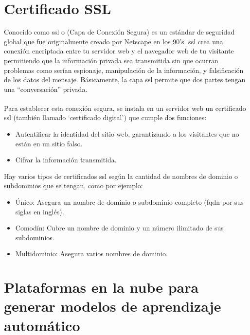 \documentclass[12pt, a4paper, titlepage]{report}
\begin{document}
		 \section{Certificado SSL}
			Conocido como \acrfull{ssl} o (Capa de Conexión Segura) es un estándar de seguridad global que fue originalmente creado por Netscape en los 90's. \acrshort{ssl} crea una conexión encriptada entre tu servidor web y el navegador web de tu visitante permitiendo que la información privada sea transmitida sin que ocurran problemas como serían espionaje, manipulación de la información, y falsificación de los datos del mensaje.\cite{what_is_SSL} Básicamente, la capa \acrshort{ssl} permite que dos partes tengan una “conversación” privada.\\\\
			Para establecer esta conexión segura, se instala en un servidor web un certificado \acrshort{ssl} (también llamado `certificado digital') que cumple dos funciones:
			
			\begin{itemize}
				\item Autentificar la identidad del sitio web, garantizando a los visitantes que no están en un sitio falso. 
				\item Cifrar la información transmitida.
			\end{itemize}
		
			Hay varios tipos de certificados \acrshort{ssl} \cite{ssl_certificates} según la cantidad de nombres de dominio o subdominios que se tengan, como por ejemplo:
			
			\begin{itemize}
				\item Único: Asegura un nombre de dominio o subdominio completo (\acrfull{fqdn} por sus siglas en inglés). 
				\item Comodín: Cubre un nombre de dominio y un número ilimitado de sus subdominios.
				\item Multidominio: Asegura varios nombres de dominio.
			\end{itemize}
		
		\newpage
		\section{Plataformas en la nube para generar modelos de aprendizaje automático}
		
\end{document}

